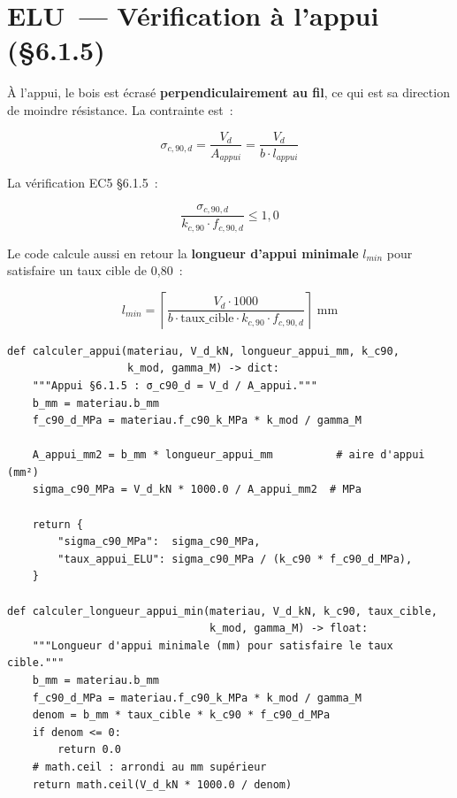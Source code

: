 \documentclass[12pt, a4paper, openany]{book}
\newcommand{\fichier}[1]{\texttt{\textit{#1}}}
\begin{document}
\section{ELU~--- V\'erification \`a l'appui (\S{}6.1.5)}

\`A l'appui, le bois est \'ecras\'e \textbf{perpendiculairement au fil},
ce qui est sa direction de moindre r\'esistance. La contrainte est~:

\begin{equation}
\sigma_{c,90,d} = \frac{V_d}{A_{appui}} = \frac{V_d}{b \cdot l_{appui}}
\end{equation}

La v\'erification EC5 \S{}6.1.5~:

\begin{equation}
\frac{\sigma_{c,90,d}}{k_{c,90} \cdot f_{c,90,d}} \leq 1{,}0
\end{equation}

Le code calcule aussi en retour la \textbf{longueur d'appui minimale}
$l_{min}$ pour satisfaire un taux cible de 0,80~:

\begin{equation}
l_{min} = \left\lceil \frac{V_d \cdot 1000}{b \cdot \text{taux\_cible} \cdot k_{c,90} \cdot f_{c,90,d}} \right\rceil \text{ mm}
\label{eq:lmin}
\end{equation}

\begin{lstlisting}[style=python, caption={\fichier{ec5/elu.py} --- appui et longueur minimale d'appui}]
def calculer_appui(materiau, V_d_kN, longueur_appui_mm, k_c90,
                   k_mod, gamma_M) -> dict:
    """Appui §6.1.5 : σ_c90_d = V_d / A_appui."""
    b_mm = materiau.b_mm
    f_c90_d_MPa = materiau.f_c90_k_MPa * k_mod / gamma_M

    A_appui_mm2 = b_mm * longueur_appui_mm          # aire d'appui (mm²)
    sigma_c90_MPa = V_d_kN * 1000.0 / A_appui_mm2  # MPa

    return {
        "sigma_c90_MPa":  sigma_c90_MPa,
        "taux_appui_ELU": sigma_c90_MPa / (k_c90 * f_c90_d_MPa),
    }

def calculer_longueur_appui_min(materiau, V_d_kN, k_c90, taux_cible,
                                k_mod, gamma_M) -> float:
    """Longueur d'appui minimale (mm) pour satisfaire le taux cible."""
    b_mm = materiau.b_mm
    f_c90_d_MPa = materiau.f_c90_k_MPa * k_mod / gamma_M
    denom = b_mm * taux_cible * k_c90 * f_c90_d_MPa
    if denom <= 0:
        return 0.0
    # math.ceil : arrondi au mm supérieur
    return math.ceil(V_d_kN * 1000.0 / denom)
\end{lstlisting}
\end{document}
